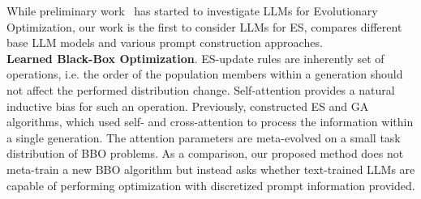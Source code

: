 While preliminary work~\cite{liu2023large, liu2023large_multi} has started to investigate LLMs for Evolutionary Optimization, our work is the first to consider LLMs for ES, compares different base LLM models and various prompt construction approaches.\\
%
\textbf{Learned Black-Box Optimization}. ES-update rules are inherently set of operations, i.e. the order of the population members within a generation should not affect the performed distribution change. Self-attention provides a natural inductive bias for such an operation. Previously, \citet{lange2023discovering_es, lange2023discovering_ga} constructed ES and GA algorithms, which used self- and cross-attention to process the information within a single generation. The attention parameters are meta-evolved on a small task distribution of BBO problems. As a comparison, our proposed method does not meta-train a new BBO algorithm but instead asks whether text-trained LLMs are capable of performing optimization with discretized prompt information provided.

